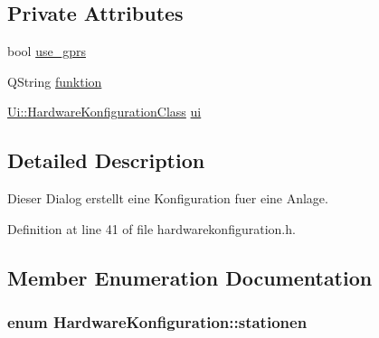 \subsection*{Private Attributes}
\begin{CompactItemize}
\item 
bool \hyperlink{class_hardware_konfiguration_d260085054ce59016c19a63b774e9957}{use\_\-gprs}
\item 
QString \hyperlink{class_hardware_konfiguration_a715366a612f28c1dab5e12d326ad5d6}{funktion}
\item 
\hyperlink{class_ui_1_1_hardware_konfiguration_class}{Ui::HardwareKonfigurationClass} \hyperlink{class_hardware_konfiguration_aa2f6fe4bcc16390f4ad5a6cfbbd5001}{ui}
\end{CompactItemize}


\subsection{Detailed Description}
Dieser Dialog erstellt eine Konfiguration fuer eine Anlage. 

Definition at line 41 of file hardwarekonfiguration.h.

\subsection{Member Enumeration Documentation}
\hypertarget{class_hardware_konfiguration_b474474dffdc4a8a5df5a422f3eedf82}{
\subsubsection[stationen]{\setlength{\rightskip}{0pt plus 5cm}enum {\bf HardwareKonfiguration::stationen}}}
\label{class_hardware_konfiguration_b474474dffdc4a8a5df5a422f3eedf82}


